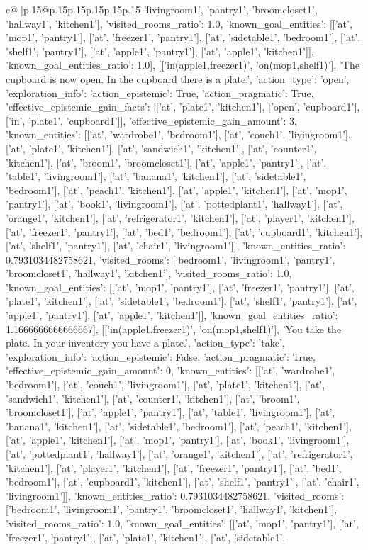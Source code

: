 \documentclass{article}
\begin{document}
{\begin{supertabular}{c@{$\;$}|p{.15\linewidth}@{}p{.15\linewidth}p{.15\linewidth}p{.15\linewidth}p{.15\linewidth}p{.15\linewidth}}
{{{'livingroom1', 'pantry1', 'broomcloset1', 'hallway1', 'kitchen1'], 'visited_rooms_ratio': 1.0, 'known_goal_entities': [['at', 'mop1', 'pantry1'], ['at', 'freezer1', 'pantry1'], ['at', 'sidetable1', 'bedroom1'], ['at', 'shelf1', 'pantry1'], ['at', 'apple1', 'pantry1'], ['at', 'apple1', 'kitchen1']], 'known_goal_entities_ratio': 1.0}}], [['in(apple1,freezer1)', 'on(mop1,shelf1)'], 'The cupboard is now open. In the cupboard there is a plate.', {'action_type': 'open', 'exploration_info': {'action_epistemic': True, 'action_pragmatic': True, 'effective_epistemic_gain_facts': [['at', 'plate1', 'kitchen1'], ['open', 'cupboard1'], ['in', 'plate1', 'cupboard1']], 'effective_epistemic_gain_amount': 3, 'known_entities': [['at', 'wardrobe1', 'bedroom1'], ['at', 'couch1', 'livingroom1'], ['at', 'plate1', 'kitchen1'], ['at', 'sandwich1', 'kitchen1'], ['at', 'counter1', 'kitchen1'], ['at', 'broom1', 'broomcloset1'], ['at', 'apple1', 'pantry1'], ['at', 'table1', 'livingroom1'], ['at', 'banana1', 'kitchen1'], ['at', 'sidetable1', 'bedroom1'], ['at', 'peach1', 'kitchen1'], ['at', 'apple1', 'kitchen1'], ['at', 'mop1', 'pantry1'], ['at', 'book1', 'livingroom1'], ['at', 'pottedplant1', 'hallway1'], ['at', 'orange1', 'kitchen1'], ['at', 'refrigerator1', 'kitchen1'], ['at', 'player1', 'kitchen1'], ['at', 'freezer1', 'pantry1'], ['at', 'bed1', 'bedroom1'], ['at', 'cupboard1', 'kitchen1'], ['at', 'shelf1', 'pantry1'], ['at', 'chair1', 'livingroom1']], 'known_entities_ratio': 0.7931034482758621, 'visited_rooms': ['bedroom1', 'livingroom1', 'pantry1', 'broomcloset1', 'hallway1', 'kitchen1'], 'visited_rooms_ratio': 1.0, 'known_goal_entities': [['at', 'mop1', 'pantry1'], ['at', 'freezer1', 'pantry1'], ['at', 'plate1', 'kitchen1'], ['at', 'sidetable1', 'bedroom1'], ['at', 'shelf1', 'pantry1'], ['at', 'apple1', 'pantry1'], ['at', 'apple1', 'kitchen1']], 'known_goal_entities_ratio': 1.1666666666666667}}], [['in(apple1,freezer1)', 'on(mop1,shelf1)'], 'You take the plate. In your inventory you have a plate.', {'action_type': 'take', 'exploration_info': {'action_epistemic': False, 'action_pragmatic': True, 'effective_epistemic_gain_amount': 0, 'known_entities': [['at', 'wardrobe1', 'bedroom1'], ['at', 'couch1', 'livingroom1'], ['at', 'plate1', 'kitchen1'], ['at', 'sandwich1', 'kitchen1'], ['at', 'counter1', 'kitchen1'], ['at', 'broom1', 'broomcloset1'], ['at', 'apple1', 'pantry1'], ['at', 'table1', 'livingroom1'], ['at', 'banana1', 'kitchen1'], ['at', 'sidetable1', 'bedroom1'], ['at', 'peach1', 'kitchen1'], ['at', 'apple1', 'kitchen1'], ['at', 'mop1', 'pantry1'], ['at', 'book1', 'livingroom1'], ['at', 'pottedplant1', 'hallway1'], ['at', 'orange1', 'kitchen1'], ['at', 'refrigerator1', 'kitchen1'], ['at', 'player1', 'kitchen1'], ['at', 'freezer1', 'pantry1'], ['at', 'bed1', 'bedroom1'], ['at', 'cupboard1', 'kitchen1'], ['at', 'shelf1', 'pantry1'], ['at', 'chair1', 'livingroom1']], 'known_entities_ratio': 0.7931034482758621, 'visited_rooms': ['bedroom1', 'livingroom1', 'pantry1', 'broomcloset1', 'hallway1', 'kitchen1'], 'visited_rooms_ratio': 1.0, 'known_goal_entities': [['at', 'mop1', 'pantry1'], ['at', 'freezer1', 'pantry1'], ['at', 'plate1', 'kitchen1'], ['at', 'sidetable1', }}}
\end{supertabular}}
\end{document}
